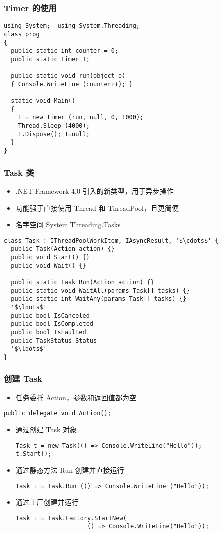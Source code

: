 \begin{frame}[fragile]
\frametitle{Timer 的使用}
\begin{lstlisting}
using System;  using System.Threading;
class prog
{
  public static int counter = 0;
  public static Timer T;

  public static void run(object o)
  { Console.WriteLine (counter++); }

  static void Main()
  {
    T = new Timer (run, null, 0, 1000);
    Thread.Sleep (4000);
    T.Dispose(); T=null;
  }
}
\end{lstlisting}
\end{frame}

\begin{frame}[fragile]
\frametitle{Task 类}
\begin{itemize}
\item .NET Framework 4.0 引入的新类型，用于异步操作
\item 功能强于直接使用 Thread 和 ThreadPool，且更简便
\item 名字空间 System.Threading.Tasks
\end{itemize}
\begin{lstlisting}[escapeinside='']
class Task : IThreadPoolWorkItem, IAsyncResult, '$\cdots$' {
  public Task(Action action) {}
  public void Start() {}
  public void Wait() {}

  public static Task Run(Action action) {}
  public static void WaitAll(params Task[] tasks) {}
  public static int WaitAny(params Task[] tasks) {}
  '$\ldots$'
  public bool IsCanceled
  public bool IsCompleted
  public bool IsFaulted
  public TaskStatus Status
  '$\ldots$'
}
\end{lstlisting}

\end{frame}

\begin{frame}[fragile]
\frametitle{创建 Task}
\begin{itemize}
\item 任务委托 Action，参数和返回值都为空
\end{itemize}
\begin{lstlisting}
public delegate void Action();
\end{lstlisting}
\begin{itemize}
\item 通过创建 Task 对象
\begin{lstlisting}
Task t = new Task(() => Console.WriteLine("Hello"));
t.Start();
\end{lstlisting}
\item 通过静态方法 Run 创建并直接运行
\begin{lstlisting}
Task t = Task.Run (() => Console.WriteLine ("Hello"));
\end{lstlisting}
\item 通过工厂创建并运行
\begin{lstlisting}
Task t = Task.Factory.StartNew(
                    () => Console.WriteLine("Hello"));

\end{lstlisting}
\end{itemize}
\end{frame}


